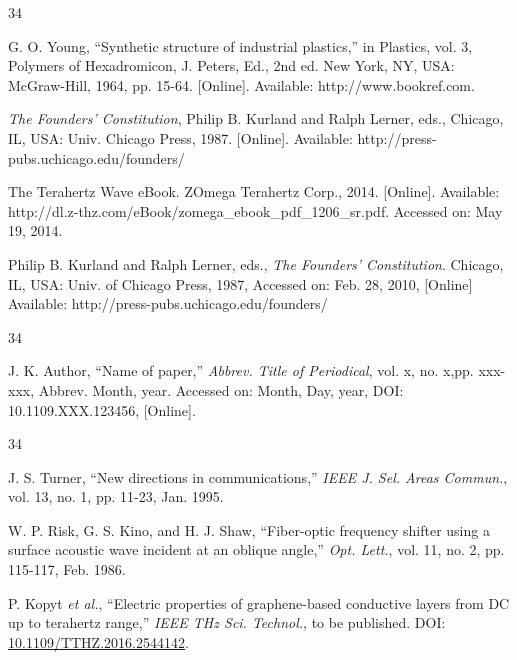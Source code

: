 \documentclass{IEEEojcsys}
\begin{document}
\vspace*{-12pt}

\begin{thebibliography}{34}
\setcounter{enumiv}{9}

\bibitem{}G. O. Young, ``Synthetic structure of industrial plastics,'' in Plastics, vol. 3, Polymers of Hexadromicon, J. Peters, Ed., 2nd ed. New York, NY, USA: McGraw-Hill, 1964, pp. 15-64. [Online]. Available: http://www.bookref.com. 

\bibitem{} {\em The Founders' Constitution}, Philip B. Kurland and Ralph Lerner, eds., Chicago, IL, USA: Univ. Chicago Press, 1987. [Online]. Available: http://press-pubs.uchicago.edu/founders/

\bibitem{} The Terahertz Wave eBook. ZOmega Terahertz Corp., 2014. [Online]. Available: http://dl.z-thz.com/eBook/zomega\_ebook\_pdf\_1206\_sr.pdf. Accessed on: May 19, 2014. 

\bibitem{} Philip B. Kurland and Ralph Lerner, eds., {\em The Founders' Constitution}. Chicago, IL, USA: Univ. of Chicago Press, 1987, Accessed on: Feb. 28, 2010, [Online] Available: http://press-pubs.uchicago.edu/founders/ 
\end{thebibliography}\vspace*{-3pt}

\vspace*{-12pt}
\begin{thebibliography}{34}
\item[]\hskip-18pt J. K. Author, ``Name of paper,'' {\em Abbrev. Title of Periodical}, vol. x, no. x,\break pp. xxx-xxx, Abbrev. Month, year. Accessed on: Month, Day, year, DOI: 10.1109.XXX.123456, [Online].
\end{thebibliography}\vspace*{-12pt}

\vspace*{-12pt}

\begin{thebibliography}{34}
\setcounter{enumiv}{13}

\bibitem{}J. S. Turner, ``New directions in communications,'' {\em IEEE J. Sel. Areas Commun.}, vol. 13, no. 1, pp. 11-23, Jan. 1995. %

\bibitem{} W. P. Risk, G. S. Kino, and H. J. Shaw, ``Fiber-optic frequency shifter using a surface acoustic wave incident at an oblique angle,'' {\em Opt. Lett.}, vol. 11, no. 2, pp. 115-117, Feb. 1986. %

\bibitem{} P. Kopyt {\em et al.}, ``Electric properties of graphene-based conductive layers from DC up to terahertz range,'' {\em IEEE THz Sci. Technol.}, to be published. DOI: \href{https://dx.doi.org/10.1109.XXX.123456}{10.1109/TTHZ.2016.2544142}.
\end{thebibliography}\vspace*{-3pt}
\end{document}
